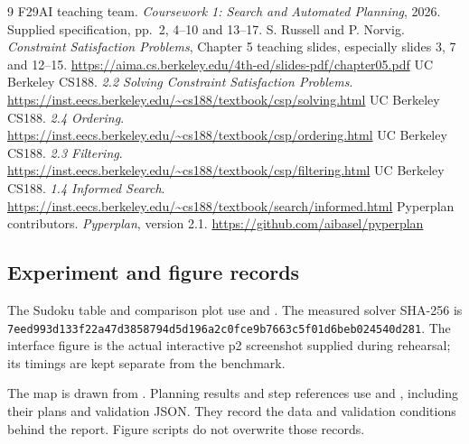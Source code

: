 \documentclass[11pt,a4paper]{article}
\begin{document}
\clearpage
\begin{thebibliography}{9}\label{references-start}
 F29AI teaching team. \emph{Coursework 1: Search and Automated Planning}, 2026. Supplied specification, pp.~2, 4--10 and 13--17.
 S. Russell and P. Norvig. \emph{Constraint Satisfaction Problems}, Chapter 5 teaching slides, especially slides 3, 7 and 12--15. \url{https://aima.cs.berkeley.edu/4th-ed/slides-pdf/chapter05.pdf}
 UC Berkeley CS188. \emph{2.2 Solving Constraint Satisfaction Problems}. \url{https://inst.eecs.berkeley.edu/~cs188/textbook/csp/solving.html}
 UC Berkeley CS188. \emph{2.4 Ordering}. \url{https://inst.eecs.berkeley.edu/~cs188/textbook/csp/ordering.html}
 UC Berkeley CS188. \emph{2.3 Filtering}. \url{https://inst.eecs.berkeley.edu/~cs188/textbook/csp/filtering.html}
 UC Berkeley CS188. \emph{1.4 Informed Search}. \url{https://inst.eecs.berkeley.edu/~cs188/textbook/search/informed.html}
 Pyperplan contributors. \emph{Pyperplan}, version 2.1. \url{https://github.com/aibasel/pyperplan}
\end{thebibliography}
\subsection*{Experiment and figure records}
The Sudoku table and comparison plot use  and . The measured solver SHA-256 is \texttt{7eed993d133f22a47d3858794d5d196a2c0fce9b7663c5f01d6beb024540d281}. The interface figure is the actual interactive p2 screenshot supplied during rehearsal; its timings are kept separate from the benchmark.

The map is drawn from . Planning results and step references use  and , including their plans and validation JSON. They record the data and validation conditions behind the report. Figure scripts do not overwrite those records.
\end{document}
